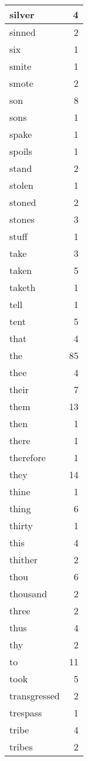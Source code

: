 \begin{center}
\begin{longtable}{l|r}
silver & 4\\ \hline 
sinned & 2\\ \hline 
six & 1\\ \hline 
smite & 1\\ \hline 
smote & 2\\ \hline 
son & 8\\ \hline 
sons & 1\\ \hline 
spake & 1\\ \hline 
spoils & 1\\ \hline 
stand & 2\\ \hline 
stolen & 1\\ \hline 
stoned & 2\\ \hline 
stones & 3\\ \hline 
stuff & 1\\ \hline 
take & 3\\ \hline 
taken & 5\\ \hline 
taketh & 1\\ \hline 
tell & 1\\ \hline 
tent & 5\\ \hline 
that & 4\\ \hline 
the & 85\\ \hline 
thee & 4\\ \hline 
their & 7\\ \hline 
them & 13\\ \hline 
then & 1\\ \hline 
there & 1\\ \hline 
therefore & 1\\ \hline 
they & 14\\ \hline 
thine & 1\\ \hline 
thing & 6\\ \hline 
thirty & 1\\ \hline 
this & 4\\ \hline 
thither & 2\\ \hline 
thou & 6\\ \hline 
thousand & 2\\ \hline 
three & 2\\ \hline 
thus & 4\\ \hline 
thy & 2\\ \hline 
to & 11\\ \hline 
took & 5\\ \hline 
transgressed & 2\\ \hline 
trespass & 1\\ \hline 
tribe & 4\\ \hline 
tribes & 2\\ \hline 

\end{longtable}
\end{center}

